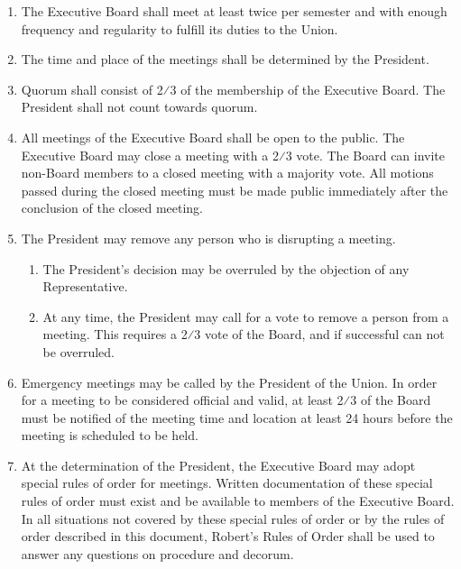 \begin{enumerate}
\item The Executive Board shall meet at least twice per semester and with enough frequency and regularity to fulfill its duties to the Union.
\item The time and place of the meetings shall be determined by the President.
\item Quorum shall consist of 2⁄3 of the membership of the Executive Board. The President shall not count towards quorum. 
\item All meetings of the Executive Board shall be open to the public. The Executive Board may close a meeting with a 2⁄3 vote. The Board can invite non-Board members to a closed meeting with a majority vote. All motions passed during the closed meeting must be made public immediately after the conclusion of the closed meeting.
\item The President may remove any person who is disrupting a meeting. 
\begin{enumerate}
\item The President’s decision may be overruled by the objection of any Representative.
\item At any time, the President may call for a vote to remove a person from a meeting. This requires a 2⁄3 vote of the Board, and if successful can not be overruled. 
\end{enumerate}
\item Emergency meetings may be called by the President of the Union. In order for a meeting to be considered official and valid, at least 2⁄3 of the Board must be notified of the meeting time and location at least 24 hours before the meeting is scheduled to be held.
\item At the determination of the President, the Executive Board may adopt special rules of order for meetings. Written documentation of these special rules of order must exist and be available to members of the Executive Board. In all situations not covered by these special rules of order or by the rules of order described in this document, Robert’s Rules of Order shall be used to answer any questions on procedure and decorum.
\end{enumerate}